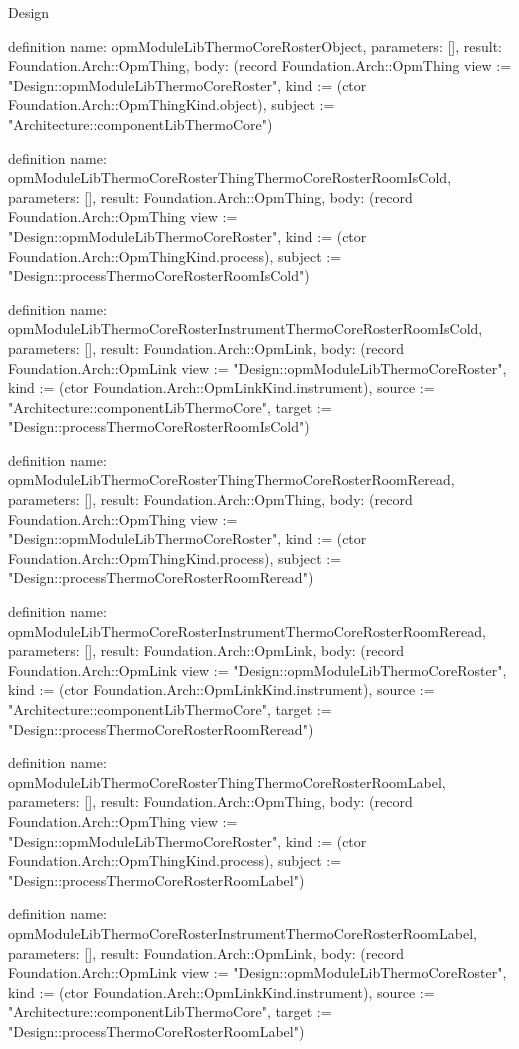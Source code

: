 \begin{lexlean}{Design}
\begin{semanticmodule}
definition{
  name: opmModuleLibThermoCoreRosterObject,
  parameters: [],
  result: Foundation.Arch::OpmThing,
  body: (record Foundation.Arch::OpmThing {view := "Design::opmModuleLibThermoCoreRoster", kind := (ctor Foundation.Arch::OpmThingKind.object), subject := "Architecture::componentLibThermoCore"})
}

definition{
  name: opmModuleLibThermoCoreRosterThingThermoCoreRosterRoomIsCold,
  parameters: [],
  result: Foundation.Arch::OpmThing,
  body: (record Foundation.Arch::OpmThing {view := "Design::opmModuleLibThermoCoreRoster", kind := (ctor Foundation.Arch::OpmThingKind.process), subject := "Design::processThermoCoreRosterRoomIsCold"})
}

definition{
  name: opmModuleLibThermoCoreRosterInstrumentThermoCoreRosterRoomIsCold,
  parameters: [],
  result: Foundation.Arch::OpmLink,
  body: (record Foundation.Arch::OpmLink {view := "Design::opmModuleLibThermoCoreRoster", kind := (ctor Foundation.Arch::OpmLinkKind.instrument), source := "Architecture::componentLibThermoCore", target := "Design::processThermoCoreRosterRoomIsCold"})
}

definition{
  name: opmModuleLibThermoCoreRosterThingThermoCoreRosterRoomReread,
  parameters: [],
  result: Foundation.Arch::OpmThing,
  body: (record Foundation.Arch::OpmThing {view := "Design::opmModuleLibThermoCoreRoster", kind := (ctor Foundation.Arch::OpmThingKind.process), subject := "Design::processThermoCoreRosterRoomReread"})
}

definition{
  name: opmModuleLibThermoCoreRosterInstrumentThermoCoreRosterRoomReread,
  parameters: [],
  result: Foundation.Arch::OpmLink,
  body: (record Foundation.Arch::OpmLink {view := "Design::opmModuleLibThermoCoreRoster", kind := (ctor Foundation.Arch::OpmLinkKind.instrument), source := "Architecture::componentLibThermoCore", target := "Design::processThermoCoreRosterRoomReread"})
}

definition{
  name: opmModuleLibThermoCoreRosterThingThermoCoreRosterRoomLabel,
  parameters: [],
  result: Foundation.Arch::OpmThing,
  body: (record Foundation.Arch::OpmThing {view := "Design::opmModuleLibThermoCoreRoster", kind := (ctor Foundation.Arch::OpmThingKind.process), subject := "Design::processThermoCoreRosterRoomLabel"})
}

definition{
  name: opmModuleLibThermoCoreRosterInstrumentThermoCoreRosterRoomLabel,
  parameters: [],
  result: Foundation.Arch::OpmLink,
  body: (record Foundation.Arch::OpmLink {view := "Design::opmModuleLibThermoCoreRoster", kind := (ctor Foundation.Arch::OpmLinkKind.instrument), source := "Architecture::componentLibThermoCore", target := "Design::processThermoCoreRosterRoomLabel"})
}


\end{semanticmodule}
\end{lexlean}
